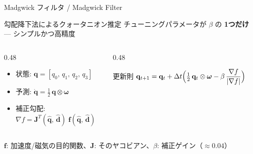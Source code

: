 \begin{frame}{Madgwick フィルタ / Madgwick Filter}
  \begin{block}{勾配降下法によるクォータニオン推定}
    チューニングパラメータが $\beta$ の \textbf{1つだけ} --- シンプルかつ高精度
  \end{block}

  \vspace{0.3em}

  \begin{columns}[c]
    \begin{column}{0.48\textwidth}
      {\small
      \begin{itemize}
        \item 状態: $\mathbf{q} = [q_0,\, q_1,\, q_2,\, q_3]$
        \item 予測: $\dot{\mathbf{q}} = \tfrac{1}{2}\,\mathbf{q} \otimes \boldsymbol{\omega}$
        \item 補正勾配:\\[2pt]
              $\nabla f = \mathbf{J}^T(\hat{\mathbf{q}},\,\hat{\mathbf{d}})\;\mathbf{f}(\hat{\mathbf{q}},\,\hat{\mathbf{d}})$
      \end{itemize}
      }
    \end{column}
    \begin{column}{0.48\textwidth}
      \begin{alertblock}{更新則}
        $\mathbf{q}_{t+1} = \mathbf{q}_t + \Delta t\Bigl(\tfrac{1}{2}\,\mathbf{q}_t \otimes \boldsymbol{\omega} - \beta\,\dfrac{\nabla f}{|\nabla f|}\Bigr)$
      \end{alertblock}
    \end{column}
  \end{columns}

  \vspace{0.3em}
  {\footnotesize $\mathbf{f}$: 加速度/磁気の目的関数、$\mathbf{J}$: そのヤコビアン、$\beta$: 補正ゲイン（$\approx 0.04$）}
\end{frame}

